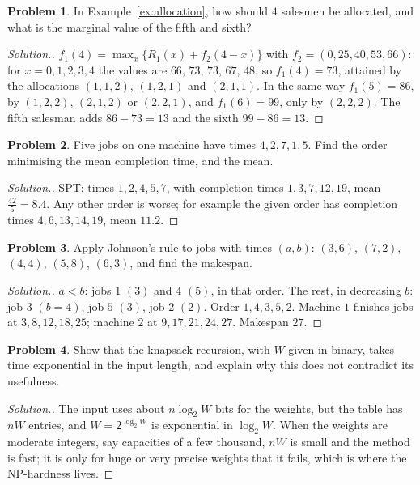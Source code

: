 \documentclass[11pt,a4paper]{article}
\numberwithin{equation}{section}
\theoremstyle{definition}
\newtheorem{problemx}{Problem}[subsection]
\newenvironment{problem}{\begin{problemx}}{\end{problemx}}
\newenvironment{solution}
  {\renewcommand{\qedsymbol}{}\begin{proof}[\textit{Solution}.]}
  {\end{proof}}
\begin{document}
\begin{problem}
In Example~\ref{ex:allocation}, how should $4$ salesmen be allocated, and what is the marginal value of the fifth and sixth?
\end{problem}

\begin{solution}
$f_1(4) = \max_x\{R_1(x) + f_2(4 - x)\}$ with $f_2 = (0, 25, 40, 53, 66)$: for $x = 0, 1, 2, 3, 4$ the values are $66$, $73$, $73$, $67$, $48$, so $f_1(4) = 73$, attained by the allocations $(1, 1, 2)$, $(1, 2, 1)$ and $(2, 1, 1)$. In the same way $f_1(5) = 86$, by $(1, 2, 2)$, $(2, 1, 2)$ or $(2, 2, 1)$, and $f_1(6) = 99$, only by
$(2, 2, 2)$. The fifth salesman adds $86 - 73 = 13$ and the sixth $99 - 86 = 13$.
\end{solution}

\begin{problem}
Five jobs on one machine have times $4, 2, 7, 1, 5$. Find the order minimising the mean completion time, and the mean.
\end{problem}

\begin{solution}
SPT: times $1, 2, 4, 5, 7$, with completion times $1, 3, 7, 12, 19$, mean $\frac{42}5 = 8.4$. Any other order is worse; for example the given order has completion times $4, 6, 13, 14, 19$, mean $11.2$.
\end{solution}

\begin{problem}
Apply Johnson's rule to jobs with times $(a, b)$: $(3, 6)$, $(7, 2)$, $(4, 4)$, $(5, 8)$, $(6, 3)$, and find the makespan.
\end{problem}

\begin{solution}
$a < b$: jobs $1$ $(3)$ and $4$ $(5)$, in that order. The rest, in decreasing $b$: job $3$ $(b = 4)$, job $5$ $(3)$, job $2$ $(2)$. Order $1, 4, 3, 5, 2$. Machine $1$ finishes jobs at $3, 8, 12, 18, 25$; machine $2$ at $9, 17, 21, 24, 27$. Makespan $27$.
\end{solution}

\begin{problem}
Show that the knapsack recursion, with $W$ given in binary, takes time exponential in the input length, and explain why this does not contradict its usefulness.
\end{problem}

\begin{solution}
The input uses about $n\log_2W$ bits for the weights, but the table has $nW$ entries, and $W = 2^{\log_2W}$ is exponential in $\log_2W$. When the weights are moderate integers, say capacities of a few thousand, $nW$ is small and the method is fast; it is only for huge or very precise weights that it fails, which is where the NP-hardness lives.
\end{solution}
\end{document}
